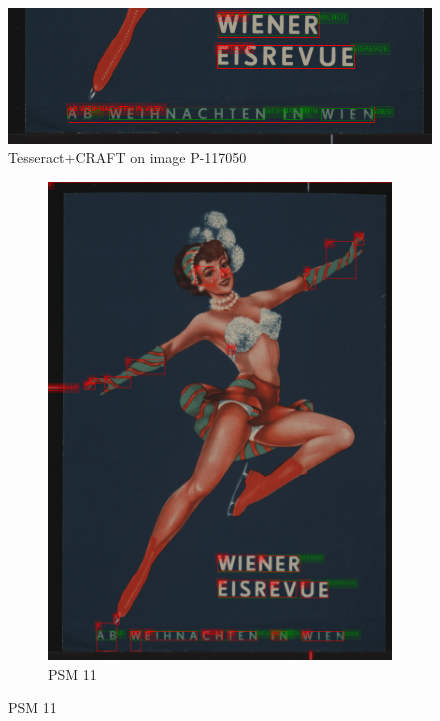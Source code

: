\begin{figure}[hbtp!]
    \centering
    \includegraphics[scale=0.36]{obrazky/plakaty/result_carfttesseract_vienna1_split-21.png}
    \caption{Tesseract+CRAFT on image P-117050}
    \label{Im2:ex:Craft}
\end{figure}

\begin{figure}[hbtp!]
    \begin{subfigure}{\textwidth}
        \centering
        \includegraphics[scale=0.36]{obrazky/plakaty/result_tesseract_vienna1_nosplit_psm11-21.png}
        \caption{PSM 11}
        \label{Im2:ex:tess11}
    \end{subfigure}


\end{figure}
